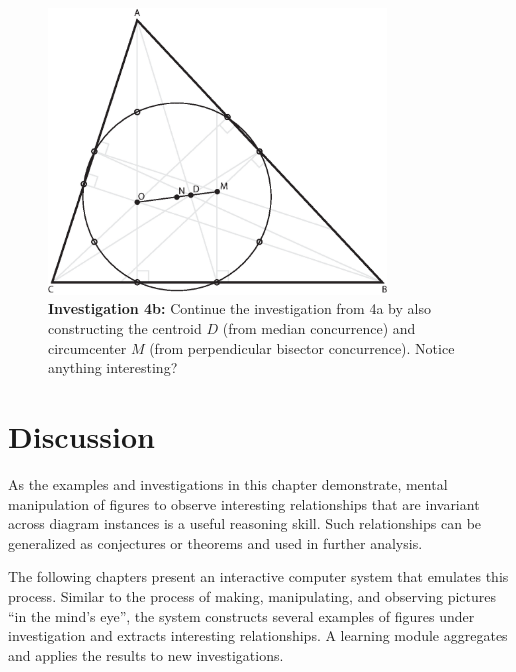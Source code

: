 \begin{figure}[h!]
\centering
\includegraphics[width=0.8\textwidth]{diagrams/euler-line.eps}
\captionsetup{labelformat=empty}
\caption{{\bf Investigation 4b:} Continue the investigation from 4a by
  also constructing the centroid $D$ (from median concurrence) and
  circumcenter $M$ (from perpendicular bisector concurrence).  Notice
  anything interesting?}
\end{figure}

\section{Discussion}

As the examples and investigations in this chapter demonstrate, mental
manipulation of figures to observe interesting relationships that are
invariant across diagram instances is a useful reasoning skill. Such
relationships can be generalized as conjectures or theorems and used
in further analysis.

The following chapters present an interactive computer system that
emulates this process. Similar to the process of making, manipulating,
and observing pictures ``in the mind's eye'', the system constructs
several examples of figures under investigation and extracts
interesting relationships. A learning module aggregates and applies
the results to new investigations.
